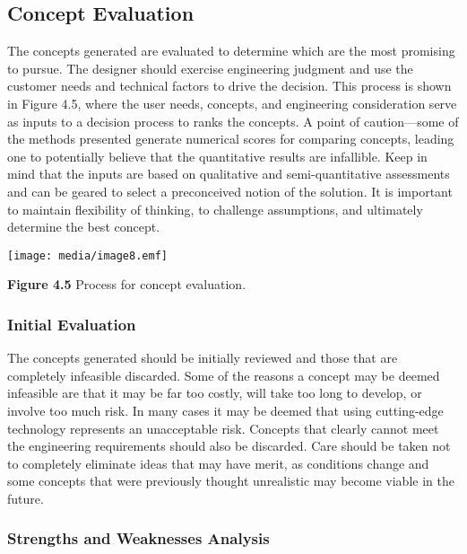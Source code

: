 \subsection{Concept Evaluation}\label{concept-evaluation}

The concepts generated are evaluated to determine which are the most
promising to pursue. The designer should exercise engineering judgment
and use the customer needs and technical factors to drive the decision.
This process is shown in Figure 4.5, where the user needs, concepts, and
engineering consideration serve as inputs to a decision process to ranks
the concepts. A point of caution---some of the methods presented
generate numerical scores for comparing concepts, leading one to
potentially believe that the quantita­tive results are infallible. Keep
in mind that the inputs are based on qualitative and semi-quantitative
assessments and can be geared to select a preconceived notion of the
solution. It is important to maintain flexibility of thinking, to
challenge assumptions, and ultimately determine the best concept.

\texttt{[image: media/image8.emf]}

\textbf{Figure 4.5} Process for concept evaluation.

\subsubsection{Initial Evaluation}\label{initial-evaluation}

The concepts generated should be initially reviewed and those that are
completely infeasible discarded. Some of the reasons a concept may be
deemed infeasible are that it may be far too costly, will take too long
to develop, or involve too much risk. In many cases it may be deemed
that using cutting-edge technology represents an unacceptable risk.
Concepts that clearly cannot meet the engineering requirements should
also be discarded. Care should be taken not to completely eliminate
ideas that may have merit, as conditions change and some concepts that
were previously thought unrealistic may become viable in the future.

\subsubsection{Strengths and Weaknesses
Analysis}\label{strengths-and-weaknesses-analysis}

